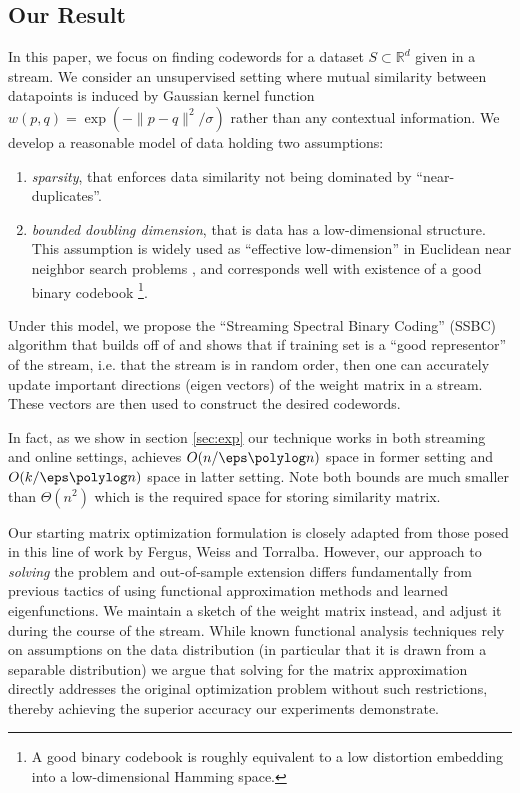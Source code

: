 \documentclass{sig-alternate}
\begin{document}
\subsection{Our Result}
 In this paper, we focus on finding codewords for a dataset $S \subset \mathbb{R}^d$ given in a stream. We consider an unsupervised setting where mutual similarity between datapoints is induced by Gaussian kernel function $w(p,q) = \exp(-\|p-q\|^2/\sigma)$ rather than any contextual information. 
We develop a reasonable model of data holding two assumptions:
\begin{enumerate}
\item \textit{sparsity},  that enforces data similarity not being dominated by ``near-duplicates''.
\item \textit{bounded doubling dimension}, that is data has a low-dimensional structure. This assumption is widely used  as ``effective low-dimension'' in Euclidean near neighbor search problems \cite{KRu,KLee,BKL06,CG06,IN07,HPK13-lowd,abdullah}, and corresponds well with existence of a good binary codebook \footnote{A good binary codebook is roughly equivalent to a low distortion embedding into a low-dimensional Hamming space.}.
\end{enumerate}
Under this model, we propose the ``Streaming Spectral Binary Coding'' (SSBC) algorithm that builds off of \fd and shows that if training set is a ``good representor'' of the stream, i.e. that the stream is in random order, then one can accurately update important directions (eigen vectors) of the weight matrix in a stream. These vectors are then used to construct the desired codewords.

In fact, as we show in section \ref{sec:exp} our technique works in both streaming and online settings, achieves $O(n/\eps \polylog n)$ space in former setting and $O( k/\eps \polylog n)$ space in latter setting. Note both bounds are much smaller than $\Theta(n^2)$ which is the required space for storing similarity matrix. 

Our starting matrix optimization formulation is closely adapted from those posed in this line of work by Fergus, Weiss and Torralba. 
However, our approach to \emph{solving} the problem and out-of-sample extension differs fundamentally from previous tactics of using functional approximation methods and learned eigenfunctions. We maintain a sketch of the weight matrix instead, and adjust it during the course of the stream. 
While known functional analysis techniques rely on assumptions on the data distribution (in particular that it is drawn from a separable distribution) we argue that solving for the matrix approximation directly addresses the original optimization problem without such restrictions, thereby achieving the superior accuracy our experiments demonstrate.
\end{document}
